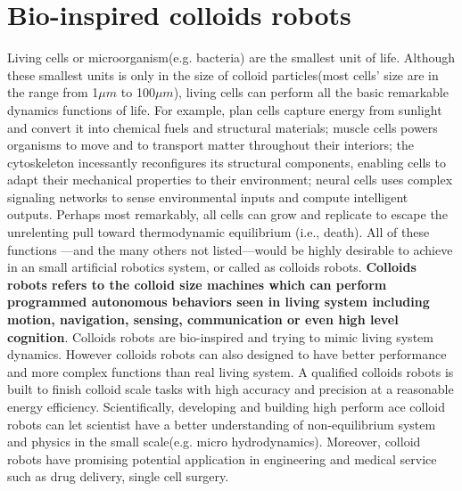\section{Bio-inspired colloids robots}
Living cells or microorganism(e.g. bacteria) are the smallest unit of life. Although these smallest units is only in the size of colloid particles(most cells' size are in the range from 1$\mu m$ to 100$\mu m$), living cells can perform all the basic remarkable dynamics functions of life. For example, plan cells capture energy from sunlight and convert it into chemical fuels and structural materials; muscle cells powers organisms to move and to transport matter throughout their interiors; the cytoskeleton incessantly reconfigures its structural components, enabling cells to adapt their mechanical properties to their environment; neural cells uses complex signaling networks to sense environmental inputs and compute intelligent outputs. Perhaps most remarkably, all cells can grow and replicate to escape the unrelenting pull toward thermodynamic equilibrium (i.e., death).  All of these functions ---and the many others not listed---would be highly desirable to achieve in an small artificial robotics system, or called as colloids robots. \textbf{Colloids robots refers to the colloid size machines which can perform  programmed autonomous behaviors seen in living system including motion, navigation, sensing, communication or even high level cognition}.  Colloids robots are bio-inspired and trying to mimic living system dynamics. However colloids robots can also designed to have better performance and more complex functions than real living system. A qualified colloids robots is built to finish colloid scale tasks with high accuracy and precision at a reasonable energy efficiency.  Scientifically, developing and building high perform ace colloid robots can let scientist have a better understanding of non-equilibrium system and physics in the small scale(e.g. micro hydrodynamics). Moreover, colloid robots have promising potential application in engineering and medical service such as drug delivery, single cell surgery. 

